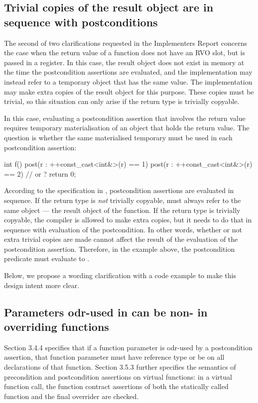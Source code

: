 \subsection{Trivial copies of the result object are in sequence with postconditions}

The second of two clarifications requested in the Implementers Report \cite{P3460R0} concerns the case when the return value of a function does not have an RVO slot, but is passed in a register. In this case, the result object does not exist in memory at the time the postcondition assertions are evaluated, and the implementation may instead refer to a temporary object that has the same value. The implementation may make extra copies of the result object for this purpose. These copies must be trivial, so this situation can only arise if the return type is trivially copyable.

In this case, evaluating a postcondition assertion that involves the return value requires temporary materialisation of an object that holds the return value. The question is whether the same materialised temporary must be used in each postcondition assertion:
\begin{codeblock}
int f()
post(r : ++const_cast<int&>(r) == 1)
post(r : ++const_cast<int&>(r) == 2) {  //  or ?
  return 0; 
}
\end{codeblock}
According to the specification in \cite{P2900R10}, postcondition assertions are evaluated in sequence. If the return type is \emph{not} trivially copyable,  must always refer to the same object --- the result object of the function. If the return type is trivially copyable, the compiler is allowed to make extra copies, but it needs to do that in sequence with evaluation of the postcondition. In other words, whether or not extra trivial copies are made cannot affect the result of the evaluation of the postcondition assertion. Therefore, in the example above, the postcondition predicate must evaluate to .

Below, we propose a wording clarification with a code example to make this design intent more clear.

\subsection{Parameters odr-used in  can be non- in overriding functions}

\cite{P2900R10} Section 3.4.4 specifies that if a function parameter is odr-used by a postcondition assertion, that function parameter must have reference type or be  on all declarations of that function. \cite{P2900R10} Section 3.5.3 further specifies the semantics of precondition and postcondition assertions on virtual functions: in a virtual function call, the function contract assertions of both the statically called function and the final overrider are checked.

